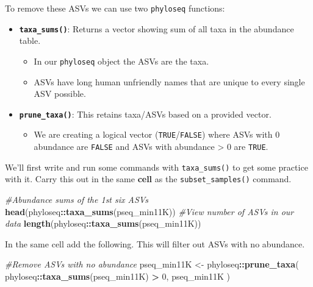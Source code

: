 \documentclass[
]{book}
\newenvironment{Shaded}{\begin{snugshade}}{\end{snugshade}}
\newcommand{\CommentTok}[1]{\textcolor[rgb]{0.56,0.35,0.01}{\textit{#1}}}
\newcommand{\DecValTok}[1]{\textcolor[rgb]{0.00,0.00,0.81}{#1}}
\newcommand{\FunctionTok}[1]{\textcolor[rgb]{0.13,0.29,0.53}{\textbf{#1}}}
\newcommand{\NormalTok}[1]{#1}
\newcommand{\OtherTok}[1]{\textcolor[rgb]{0.56,0.35,0.01}{#1}}
\newcommand{\SpecialCharTok}[1]{\textcolor[rgb]{0.81,0.36,0.00}{\textbf{#1}}}
\providecommand{\tightlist}{%
  \setlength{\itemsep}{0pt}\setlength{\parskip}{0pt}}
\begin{document}
To remove these ASVs we can use two \texttt{phyloseq} functions:

\begin{itemize}
\tightlist
\item
  \textbf{\texttt{taxa\_sums()}}: Returns a vector showing sum of all taxa in the abundance table.

  \begin{itemize}
  \tightlist
  \item
    In our \texttt{phyloseq} object the ASVs are the taxa.
  \item
    ASVs have long human unfriendly names that are unique to every single ASV possible.
  \end{itemize}
\item
  \textbf{\texttt{prune\_taxa()}}: This retains taxa/ASVs based on a provided vector.

  \begin{itemize}
  \tightlist
  \item
    We are creating a logical vector (\texttt{TRUE}/\texttt{FALSE}) where ASVs with 0 abundance are \texttt{FALSE} and ASVs with abundance \textgreater{} 0 are \texttt{TRUE}.
  \end{itemize}
\end{itemize}

We'll first write and run some commands with \texttt{taxa\_sums()} to get some practice with it. Carry this out in the same \textbf{cell} as the \texttt{subset\_samples()} command.

\begin{Shaded}
\begin{Highlighting}[]
\CommentTok{\#Abundance sums of the 1st six ASVs}
\FunctionTok{head}\NormalTok{(phyloseq}\SpecialCharTok{::}\FunctionTok{taxa\_sums}\NormalTok{(pseq\_min11K))}
\CommentTok{\#View number of ASVs in our data}
\FunctionTok{length}\NormalTok{(phyloseq}\SpecialCharTok{::}\FunctionTok{taxa\_sums}\NormalTok{(pseq\_min11K))}
\end{Highlighting}
\end{Shaded}

In the same cell add the following.
This will filter out ASVs with no abundance.

\begin{Shaded}
\begin{Highlighting}[]
\CommentTok{\#Remove ASVs with no abundance}
\NormalTok{pseq\_min11K }\OtherTok{\textless{}{-}}\NormalTok{ phyloseq}\SpecialCharTok{::}\FunctionTok{prune\_taxa}\NormalTok{(}
\NormalTok{  phyloseq}\SpecialCharTok{::}\FunctionTok{taxa\_sums}\NormalTok{(pseq\_min11K) }\SpecialCharTok{\textgreater{}} \DecValTok{0}\NormalTok{, pseq\_min11K}
\NormalTok{)}
\end{Highlighting}
\end{Shaded}
\end{document}
